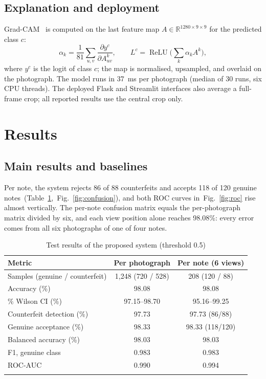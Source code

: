 \documentclass[pdflatex,sn-mathphys-num]{sn-jnl}
\begin{document}
\subsection{Explanation and deployment}\label{sec:deploy}

Grad-CAM~\cite{selvaraju2017gradcam} is computed on the last feature map
$A\in\mathbb{R}^{1280\times9\times9}$ for the predicted class $c$:
\begin{equation}
\alpha_k = \frac{1}{81}\sum_{u,v}\frac{\partial y^{c}}{\partial A^{k}_{uv}},\qquad
L^{c} = \operatorname{ReLU}\!\Big(\sum_{k}\alpha_k A^{k}\Big),
\label{eq:gradcam}
\end{equation}
where $y^c$ is the logit of class $c$; the map is normalised, upsampled, and overlaid on
the photograph. The model runs in 37~ms per photograph (median of 30 runs, six CPU
threads). The deployed Flask and Streamlit interfaces also average a full-frame crop;
all reported results use the central crop only.

\section{Results}\label{sec:results}

\subsection{Main results and baselines}\label{sec:main}

Per note, the system rejects 86 of 88 counterfeits and accepts 118 of 120 genuine notes~(Table~\ref{tab:main},~Fig.~\ref{fig:confusion}), and both ROC curves in~Fig.~\ref{fig:roc} rise almost vertically. The per-note confusion matrix equals the
per-photograph matrix divided by six, and each view position alone reaches 98.08\%:
every error comes from all six photographs of one of four notes.

\begin{table}[!t]
\caption{Test results of the proposed system (threshold 0.5)}\label{tab:main}
\begin{tabular*}{\textwidth}{@{\extracolsep\fill}lcc}
\toprule
Metric & Per photograph & Per note (6 views) \\
\midrule
Samples (genuine / counterfeit) & 1{,}248 (720 / 528) & 208 (120 / 88) \\
Accuracy (\%) & 98.08 & 98.08 \\
\quad 95\% Wilson CI (\%) & 97.15--98.70 & 95.16--99.25 \\
Counterfeit detection (\%) & 97.73 & 97.73 (86/88) \\
Genuine acceptance (\%) & 98.33 & 98.33 (118/120) \\
Balanced accuracy (\%) & 98.03 & 98.03 \\
F1, genuine class & 0.983 & 0.983 \\
ROC-AUC & 0.990 & 0.994 \\
\botrule
\end{tabular*}
\end{table}
\end{document}
